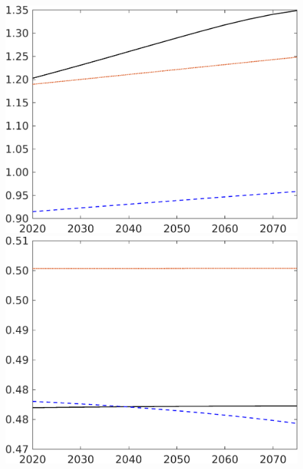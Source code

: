 \begin{figure}[h!!]
\begin{minipage}[]{0.32\textwidth}
	\end{minipage}
\begin{minipage}[]{0.32\textwidth}
	\includegraphics[width=1\textwidth]{../../codding_model/own_basedOnFried/optimalPol_elastS_DisuSci/figures/all_1705/Extern_CompEff_wl_spillover0_noskill0_sep1_BN0_ineq0_red0_etaa0.79_lgd0.png}
\end{minipage}
\begin{minipage}[]{0.32\textwidth}
	\includegraphics[width=1\textwidth]{../../codding_model/own_basedOnFried/optimalPol_elastS_DisuSci/figures/all_1705/Extern_CompEff_hh_spillover0_noskill0_sep1_BN0_ineq0_red0_etaa0.79_lgd0.png}

\end{minipage}
\end{figure}

